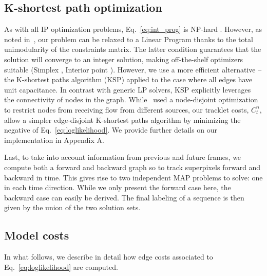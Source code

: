 \subsection{K-shortest path optimization}
As with all IP optimization problems, Eq.~\eqref{eq:int_prog} is NP-hard \cite{papadimitriou81}. However, as noted in~\cite{berclaz11}, our problem can be relaxed to a Linear Program thanks to the total unimodularity of the constraints matrix. The latter condition guarantees that the solution will converge to an integer solution, making off-the-shelf optimizers suitable (\eg Simplex \cite{klee70}, Interior point \cite{kojima89}). However, we use a more efficient alternative -- the K-shortest paths algorithm (KSP) applied to the case where all edges have unit capacitance.
In contrast with generic LP solvers, KSP explicitly leverages the connectivity of nodes in the graph.
While~\cite{berclaz11} used a node-disjoint optimization to restrict nodes from receiving flow from different sources, our tracklet costs, $C_t^n$, allow a simpler edge-disjoint K-shortest paths algorithm by minimizing the negative of Eq.~\eqref{eq:loglikelihood}.
We provide further details on our implementation in Appendix A.

Last, to take into account information from previous and future frames, we compute both a forward and backward graph so to track superpixels forward and backward in time. This gives rise to two independent MAP problems to solve: one in each time direction. While we only present the forward case here, the backward case can easily be derived. The final labeling of a sequence is then given by the union of the two solution sets.

\subsection{Model costs}\label{sec:costs}
In what follows, we describe in detail how edge costs associated to Eq.~\eqref{eq:loglikelihood} are computed.

